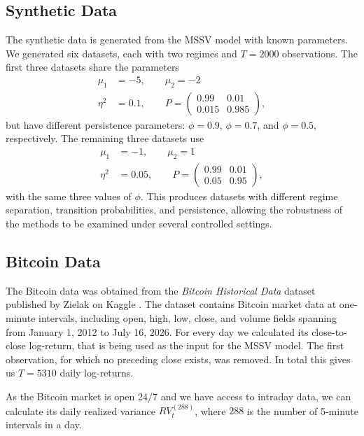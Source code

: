 \subsection{Synthetic Data}
The synthetic data is generated from the MSSV model with known parameters. We generated six datasets, each with two regimes and $T=2000$ observations. The first three datasets share the parameters
\begin{align*}
    \mu_1 &= -5, \qquad \mu_2 = -2 \\
    \eta^2 &= 0.1, \qquad 
    P = \begin{pmatrix}
        0.99 & 0.01 \\
        0.015 & 0.985
    \end{pmatrix},
\end{align*}
but have different persistence parameters: $\phi=0.9$, $\phi=0.7$, and $\phi=0.5$, respectively. The remaining three datasets use
\begin{align*}
    \mu_1 &= -1, \qquad \mu_2 = 1 \\
    \eta^2 &= 0.05, \qquad 
    P = \begin{pmatrix}
        0.99 & 0.01 \\
        0.05 & 0.95
    \end{pmatrix},
\end{align*}
with the same three values of $\phi$. This produces datasets with different regime separation, transition probabilities, and persistence, allowing the robustness of the methods to be examined under several controlled settings.

\subsection{Bitcoin Data}
The Bitcoin data was obtained from the \emph{Bitcoin Historical Data} dataset
published by Zielak on Kaggle \cite{zielak2017bitcoin}.  The dataset contains
Bitcoin market data at one-minute intervals, including open, high, low, close,
and volume fields spanning from January 1, 2012 to July 16, 2026.
For every day we calculated its close-to-close log-return, that is being used as the input for the MSSV model.  
The first observation, for which no preceding close exists, was removed. 
In total this gives us $T=5310$ daily log-returns.  

As the Bitcoin market is open 24/7 and we have access to intraday data, we can calculate its daily realized variance $RV_t^{(288)}$, where $288$ is the number of 5-minute intervals in a day.

